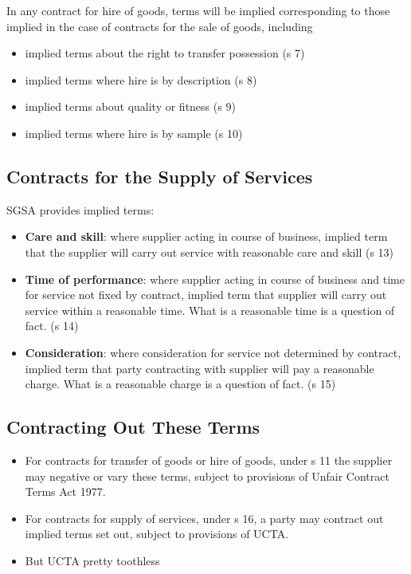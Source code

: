 \documentclass[
]{article}
\providecommand{\tightlist}{%
  \setlength{\itemsep}{0pt}\setlength{\parskip}{0pt}}
\begin{document}
In any contract for hire of goods, terms will be implied corresponding
to those implied in the case of contracts for the sale of goods,
including

\begin{itemize}
\tightlist
\item
  implied terms about the right to transfer possession (s 7)
\item
  implied terms where hire is by description (s 8)
\item
  implied terms about quality or fitness (s 9)
\item
  implied terms where hire is by sample (s 10)
\end{itemize}

\hypertarget{contracts-for-the-supply-of-services}{%
\subsection{Contracts for the Supply of
Services}\label{contracts-for-the-supply-of-services}}

SGSA provides implied terms:

\begin{itemize}
\tightlist
\item
  \textbf{Care and skill}: where supplier acting in course of business,
  implied term that the supplier will carry out service with reasonable
  care and skill (s 13)
\item
  \textbf{Time of performance}: where supplier acting in course of
  business and time for service not fixed by contract, implied term that
  supplier will carry out service within a reasonable time. What is a
  reasonable time is a question of fact. (s 14)
\item
  \textbf{Consideration}: where consideration for service not determined
  by contract, implied term that party contracting with supplier will
  pay a reasonable charge. What is a reasonable charge is a question of
  fact. (s 15)
\end{itemize}

\hypertarget{contracting-out-these-terms}{%
\subsection{Contracting Out These
Terms}\label{contracting-out-these-terms}}

\begin{itemize}
\tightlist
\item
  For contracts for transfer of goods or hire of goods, under s 11 the
  supplier may negative or vary these terms, subject to provisions of
  Unfair Contract Terms Act 1977.
\item
  For contracts for supply of services, under s 16, a party may contract
  out implied terms set out, subject to provisions of UCTA.
\item
  But UCTA pretty toothless
\end{itemize}
\end{document}
